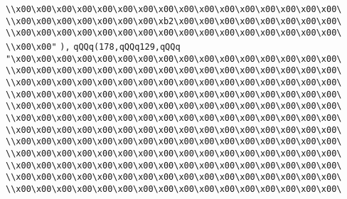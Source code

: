 \verb|\\x00\x00\x00\x00\x00\x00\x00\x00\x00\x00\x00\x00\x00\x00\x00\x00\|\newline
\verb|\\x00\x00\x00\x00\x00\x00\x00\xb2\x00\x00\x00\x00\x00\x00\x00\x00\|\newline
\verb|\\x00\x00\x00\x00\x00\x00\x00\x00\x00\x00\x00\x00\x00\x00\x00\x00\|\newline
\verb|\\x00\x00"|\newline
\verb|),|\newline
\verb|qQQq(178,qQQq129,qQQq|\newline
\verb|"\x00\x00\x00\x00\x00\x00\x00\x00\x00\x00\x00\x00\x00\x00\x00\x00\|\newline
\verb|\\x00\x00\x00\x00\x00\x00\x00\x00\x00\x00\x00\x00\x00\x00\x00\x00\|\newline
\verb|\\x00\x00\x00\x00\x00\x00\x00\x00\x00\x00\x00\x00\x00\x00\x00\x00\|\newline
\verb|\\x00\x00\x00\x00\x00\x00\x00\x00\x00\x00\x00\x00\x00\x00\x00\x00\|\newline
\verb|\\x00\x00\x00\x00\x00\x00\x00\x00\x00\x00\x00\x00\x00\x00\x00\x00\|\newline
\verb|\\x00\x00\x00\x00\x00\x00\x00\x00\x00\x00\x00\x00\x00\x00\x00\x00\|\newline
\verb|\\x00\x00\x00\x00\x00\x00\x00\x00\x00\x00\x00\x00\x00\x00\x00\x00\|\newline
\verb|\\x00\x00\x00\x00\x00\x00\x00\x00\x00\x00\x00\x00\x00\x00\x00\x00\|\newline
\verb|\\x00\x00\x00\x00\x00\x00\x00\x00\x00\x00\x00\x00\x00\x00\x00\x00\|\newline
\verb|\\x00\x00\x00\x00\x00\x00\x00\x00\x00\x00\x00\x00\x00\x00\x00\x00\|\newline
\verb|\\x00\x00\x00\x00\x00\x00\x00\x00\x00\x00\x00\x00\x00\x00\x00\x00\|\newline
\verb|\\x00\x00\x00\x00\x00\x00\x00\x00\x00\x00\x00\x00\x00\x00\x00\x00\|\newline
